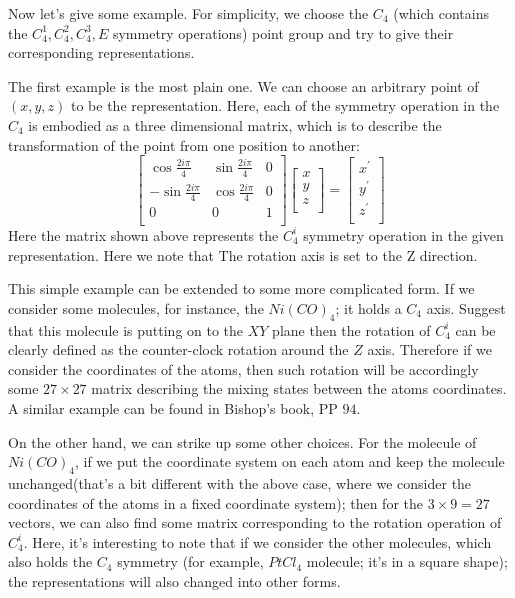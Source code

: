 Now let's give some example. For simplicity, we choose the $C_{4}$
(which contains the $C^{1}_{4}, C^{2}_{4}, C^{3}_{4}, E$ symmetry
operations) point group and try to give their corresponding
representations.

The first example is the most plain one. We can choose an arbitrary
point of $(x,y,z)$ to be the representation. Here, each of the
symmetry operation in the $C_{4}$ is embodied as a three dimensional
matrix, which is to describe the transformation of the point from one
position to another:
\begin{equation}\label{}
  \begin{bmatrix}
    \cos \frac{2i\pi}{4} & \sin \frac{2i\pi}{4} & 0 \\
    -\sin \frac{2i\pi}{4} & \cos \frac{2i\pi}{4} & 0 \\
    0                   & 0                   & 1 \\
  \end{bmatrix}
  \begin{bmatrix}
    x \\
    y \\
    z \\
  \end{bmatrix}
  =
  \begin{bmatrix}
    x^{'} \\
    y^{'} \\
    z^{'} \\
  \end{bmatrix}
\end{equation}
Here the matrix shown above represents the $C^{i}_{4}$ symmetry
operation in the given representation. Here we note that The rotation
axis is set to the Z direction.

This simple example can be extended to some more complicated form.  If
we consider some molecules, for instance, the $Ni(CO)_{4}$; it holds a
$C_{4}$ axis. Suggest that this molecule is putting on to the $XY$
plane then the rotation of $C^{i}_{4}$ can be clearly defined as the
counter-clock rotation around the $Z$ axis. Therefore if we consider
the coordinates of the atoms, then such rotation will be accordingly
some $27\times 27$ matrix describing the mixing states between the
atoms coordinates. A similar example can be found in Bishop's
book\cite{Bishop}, PP $94$.

On the other hand, we can strike up some other choices. For the
molecule of $Ni(CO)_{4}$, if we put the coordinate system on each atom
and keep the molecule unchanged(that's a bit different with the above
case, where we consider the coordinates of the atoms in a fixed
coordinate system); then for the $3\times 9=27$ vectors, we can also
find some matrix corresponding to the rotation operation of
$C_{4}^{i}$. Here, it's interesting to note that if we consider the
other molecules, which also holds the $C_{4}$ symmetry (for example,
$PtCl_{4}$ molecule; it's in a square shape); the representations will
also changed into other forms.

